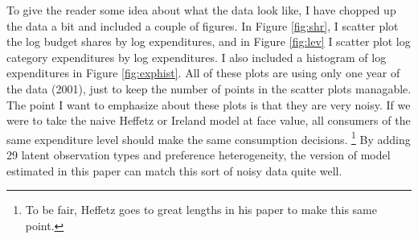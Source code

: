 \documentclass[12pt]{article}
\begin{document}
To give the reader some idea about what the data look like, I have chopped up the data a bit and included a couple of figures.  
In Figure \ref{fig:shr}, I scatter plot the log budget shares by log expenditures, and in Figure \ref{fig:lev} I scatter plot log category expenditures by log expenditures.  
I also included a histogram of log expenditures in Figure \ref{fig:exphist}.  
All of these plots are using only one year of the data (2001), just to keep the number of points in the scatter plots managable. 
The point I want to emphasize about these plots is that they are very noisy.
If we were to take the naive Heffetz or Ireland model at face value, all consumers of the same expenditure level should make the same consumption decisions.
\footnote{To be fair, Heffetz goes to great lengths in his paper to make this same point.}
By adding 29 latent observation types and preference heterogeneity, the version of model estimated in this paper can match this sort of noisy data quite well.
\end{document}
